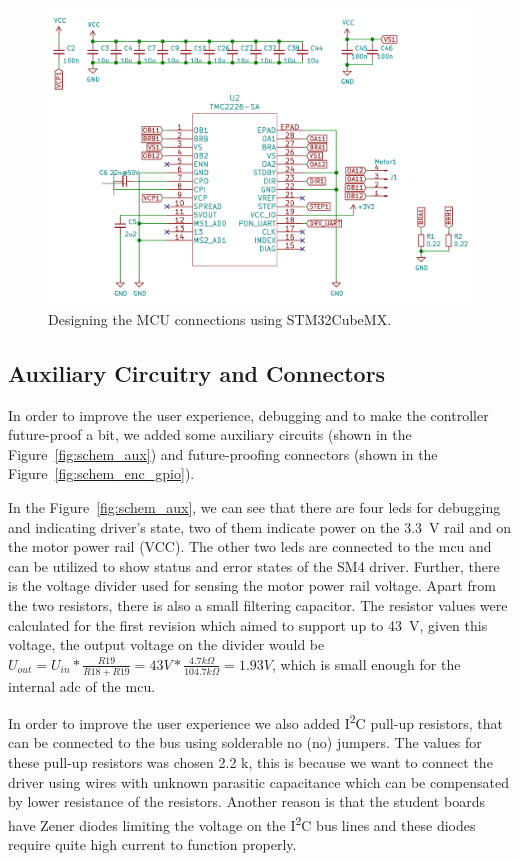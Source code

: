 \begin{figure}[H]
    \centering
    \includegraphics[width=\textwidth]{obrazky/schem_driver_rev2}
    \caption{Designing the MCU connections using STM32CubeMX.}
    \label{fig:schem_driver2}
\end{figure}

\subsection{Auxiliary Circuitry and Connectors}
\label{subsec:aux_connectors}
In order to improve the user experience, debugging and to make the controller future-proof a bit, we added some auxiliary circuits (shown in the Figure~\ref{fig:schem_aux}) and future-proofing connectors (shown in the Figure~\ref{fig:schem_enc_gpio}).

In the Figure~\ref{fig:schem_aux}, we can see that there are four \acs{led}s for debugging and indicating driver's state, two of them indicate power on the 3.3~V rail and on the motor power rail (VCC).
The other two \acs{led}s are connected to the \acs{mcu} and can be utilized to show status and error states of the SM4 driver.
Further, there is the voltage divider used for sensing the motor power rail voltage.
Apart from the two resistors, there is also a small filtering capacitor.
The resistor values were calculated for the first revision which aimed to support up to 43~V, given this voltage, the output voltage on the divider would be $U_{out} = U_{in} * \frac{R19}{R18+R19} = 43 V * \frac{4.7 k\Omega}{104.7 k\Omega} = 1.93 V$, which is small enough for the internal \acs{adc} of the \acs{mcu}.

In order to improve the user experience we also added I\textsuperscript{2}C pull-up resistors, that can be connected to the bus using solderable \acs{no} (\acl{no}) jumpers.
The values for these pull-up resistors was chosen 2.2 k\textohm, this is because we want to connect the driver using wires with unknown parasitic capacitance which can be compensated by lower resistance of the resistors.
Another reason is that the student boards have Zener diodes limiting the voltage on the I\textsuperscript{2}C bus lines and these diodes require quite high current to function properly.

